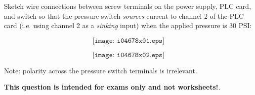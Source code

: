 

Sketch wire connections between screw terminals on the power supply, PLC card, and switch so that the pressure switch {\it sources} current to channel 2 of the PLC card (i.e. using channel 2 as a {\it sinking} input) when the applied pressure is 30 PSI:

$$\texttt{[image: i04678x01.eps]}$$







$$\texttt{[image: i04678x02.eps]}$$

Note: polarity across the pressure switch terminals is irrelevant.







{\bf This question is intended for exams only and not worksheets!}.



